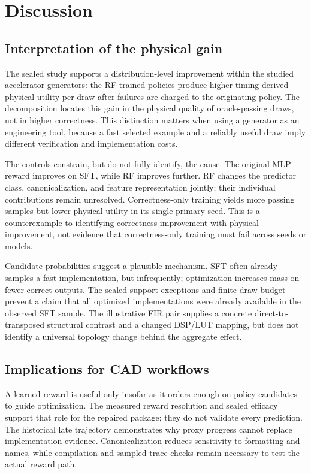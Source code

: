 \section{Discussion}
\label{sec:discussion}

\subsection{Interpretation of the physical gain}

The sealed study supports a distribution-level improvement within the studied
accelerator generators: the RF-trained policies produce higher timing-derived
physical utility per draw after failures are charged to the originating
policy.  The decomposition locates this gain in the physical quality of
oracle-passing draws, not in higher correctness.  This distinction matters when
using a generator as an engineering tool, because a fast selected example and
a reliably useful draw imply different verification and implementation costs.

The controls constrain, but do not fully identify, the cause.  The original
MLP reward improves on SFT, while RF improves further.  RF changes the predictor
class, canonicalization, and feature representation jointly; their individual
contributions remain unresolved.  Correctness-only training yields more passing
samples but lower physical utility in its single primary seed.  This is a
counterexample to identifying correctness improvement with physical improvement,
not evidence that correctness-only training must fail across seeds or models.

Candidate probabilities suggest a plausible mechanism.  SFT often already
samples a fast implementation, but infrequently; optimization increases mass
on fewer correct outputs.  The sealed support exceptions and finite draw budget
prevent a claim that all optimized implementations were already available in
the observed SFT sample.  The illustrative FIR pair supplies a concrete
direct-to-transposed structural contrast and a changed DSP/LUT mapping, but does
not identify a universal topology change behind the aggregate effect.

\subsection{Implications for CAD workflows}

A learned reward is useful only insofar as it orders enough on-policy
candidates to guide optimization.  The measured reward resolution and sealed
efficacy support that role for the repaired package; they do not validate every
prediction.  The historical late trajectory demonstrates why proxy progress
cannot replace implementation evidence.  Canonicalization reduces sensitivity
to formatting and names, while compilation and sampled trace checks remain
necessary to test the actual reward path.

